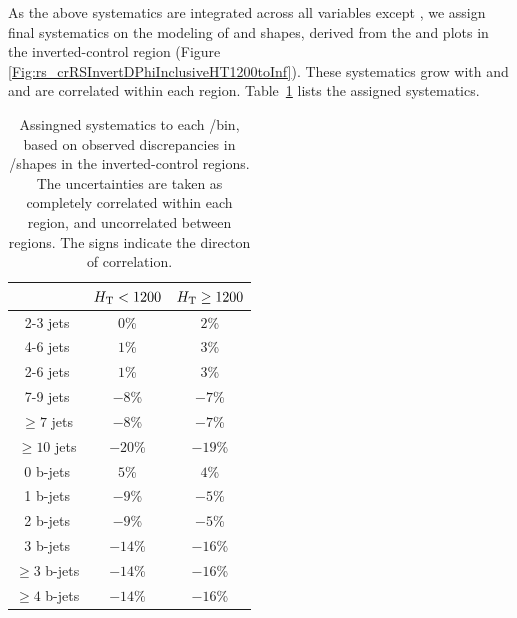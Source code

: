 As the above systematics are integrated across all variables except \Ht, we assign final systematics on the modeling of \Nj and \Nb shapes,
derived from the \Nj and \Nb plots in the inverted-\dpmin control region (Figure \ref{Fig:rs_crRSInvertDPhiInclusiveHT1200toInf}). These systematics
grow with \Nj and \Nb and are correlated within each \Ht region. Table~\ref{tab:rs_njnb_systematics} lists the assigned systematics.

\begin{table}[h]
\caption{Assingned systematics to each \Nj/\Nb bin, based on observed discrepancies in \Nj/\Nb shapes in the inverted-\dpmin control regions.
The uncertainties are taken as completely correlated within each \Ht region, and uncorrelated between \Ht regions.
The signs indicate the directon of correlation.
\label{tab:rs_njnb_systematics}}
\centering
\begin{tabular}{c|cc}
\hline
 & $H_{\mathrm{T}}<1200$ & $H_{\mathrm{T}}\geq1200$ \\
\hline
2-3 jets      & $0$\%   & $2$\% \\
4-6 jets      & $1$\%  & $3$\% \\
2-6 jets      & $1$\%   & $3$\% \\
7-9 jets      & $-8$\%  & $-7$\% \\
$\geq7$ jets  & $-8$\%  & $-7$\% \\
$\geq10$ jets & $-20$\% & $-19$\% \\
\hline
0 b-jets       & $5$\%     & $4$\% \\
1 b-jets       & $-9$\%    & $-5$\% \\
2 b-jets       & $-9$\%   & $-5$\% \\
3 b-jets       & $-14$\%   & $-16$\% \\
$\geq3$ b-jets & $-14$\%   & $-16$\% \\
$\geq4$ b-jets & $-14$\%   & $-16$\% \\
\end{tabular}
\end{table}
